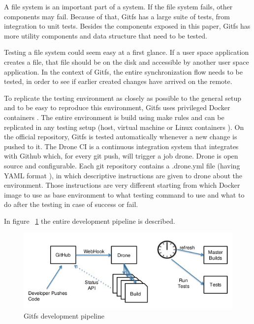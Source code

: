 A file system is an important part of a system. If the file system fails, other components may fail. Because of that, Gitfs has a large suite of tests, from integration to unit tests. Besides the components exposed in this paper, Gitfs has more utility components and data structure that need to be tested.

Testing a file system could seem easy at a first glance. If a user space application creates a file, that file should be on the disk and accessible by another user space application. In the context of Gitfs, the entire synchronization flow needs to be tested, in order to see if earlier created changes have arrived on the remote.

To replicate the testing environment as closely as possible to the general setup and to be easy to reproduce this environment, Gitfs uses privileged Docker containers \cite{Merkel2014}. The entire environment is build using make rules and can be replicated in any testing setup (host, virtual machine or Linux containers \cite{Rosen2014}). On the official repository, Gitfs is tested automatically whenever a new change is pushed to it. The Drone CI \cite{Drone2016} is a continuous integration system that integrates with Github which, for every git push, will trigger a job drone. Drone is open source and configurable. Each git repository contains a .drone.yml file (having YAML format \cite{Ben-Kiki2009}), in which descriptive instructions are given to drone about the environment. Those instructions are very different starting from which Docker image to use as base environment to what testing command to use and what to do after the testing in case of success or fail.

In figure ~\ref{fig:pipeline} the entire development pipeline is described.

\begin{figure}[h]
  \begin{center}
    \includegraphics[width=16cm]{layout/drone.png}
  \end{center}
  \caption{Gitfs development pipeline \cite{GDR}}
  \label{fig:pipeline}
\end{figure}

